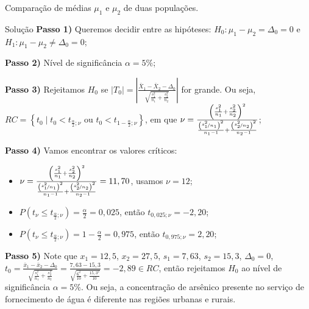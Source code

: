 \documentclass[9pt]{beamer}
\begin{document}
\begin{frame}{Comparação de médias $\mu_1$ e $\mu_2$ de duas populações.}

\scriptsize
\begin{block}{Solução}
	\textbf{Passo 1)} Queremos decidir entre as hipóteses: $H_0: \mu_1 - \mu_2 = \Delta_0=0$ e $H_1: \mu_1 - \mu_2 \neq \Delta_0=0$;
	
	\textbf{Passo 2)} Nível de significância $\alpha=5\%$;
	
	\textbf{Passo 3)} Rejeitamos $H_0$ se $\lvert T_0 \rvert = \left\lvert \frac{\bar{X}_1 - \bar{X}_2 - \Delta_0}{\sqrt{\frac{s_1^2}{n_1} + \frac{s_2^2}{n_2}}} \right\rvert$ for grande. Ou seja, $RC = \left\{ t_0 \mid t_0 < t_{\frac{\alpha}{2}; \nu} \mbox{ ou } t_0 < t_{1-\frac{\alpha}{2};\nu} \right\}$, em que $\nu = \frac{\left(\frac{s_1^2}{n_1} + \frac{s_2^2}{n_2} \right)^2}{\frac{\left(\nicefrac{s_1^2}{n_1}\right)^2}{n_1-1} + \frac{\left(\nicefrac{s_2^2}{n_2}\right)^2}{n_2-1}}$;
	
	\textbf{Passo 4)} Vamos encontrar os valores críticos:
	\begin{itemize}
		\item $\nu = \frac{\left(\frac{s_1^2}{n_1} + \frac{s_2^2}{n_2} \right)^2}{\frac{\left(\nicefrac{s_1^2}{n_1}\right)^2}{n_1-1} + \frac{\left(\nicefrac{s_2^2}{n_2}\right)^2}{n_2-1}} = 11,70$, usamos $\nu=12$;
		\item $P(t_{\nu} \leq t_{\frac{\alpha}{2}; \nu}) = \frac{\alpha}{2} = 0,025$, então $t_{0,025; \nu} = -2,20$;
		\item $P(t_{\nu} \leq t_{\frac{\alpha}{2}; \nu}) =1- \frac{\alpha}{2} = 0,975$, então $t_{0,975; \nu} = 2,20$;
	\end{itemize}

	\textbf{Passo 5)} Note que $x_1=12,5$, $x_2=27,5$, $s_1=7,63$, $s_2=15,3$, $\Delta_0=0$, $t_0 = \frac{\bar{x}_1 - \bar{x}_2 - \Delta_0}{\sqrt{\frac{s_1^2}{n_1} + \frac{s_2^2}{n_2}}} = \frac{7,63 - 15,3}{\sqrt{\frac{6^2}{10} + \frac{15,3^2}{10}}}=-2,89 \in RC$, então rejeitamos $H_0$ ao nível de significância $\alpha=5\%$. Ou seja, a concentração de arsênico presente no serviço de fornecimento de água é diferente nas regiões urbanas e rurais.
\end{block}
\normalsize

\end{frame}
\end{document}

